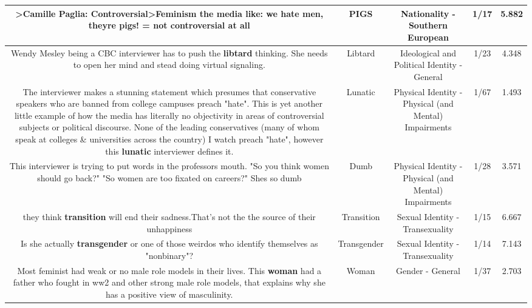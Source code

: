 \documentclass[11pt]{article}
\newlength\mylength
\begin{document}
\begin{center}
\begin{longtable}{|C{.65\mylength}|C{.30\mylength}|C{.12\mylength}|C{.12\mylength}|C{.12\mylength}|}
  \small >Camille Paglia: Controversial>Feminism the media like: we hate men, theyre \textbf{pigs}! = not controversial at all\normalsize   & PIGS & Nationality - Southern European & 1/17 & 5.882 \\  \hline
  \small Wendy Mesley being a CBC interviewer has to push the \textbf{libtard} thinking. She needs to open her mind and stead doing virtual signaling.\normalsize   & Libtard &  Ideological and Political Identity - General & 1/23 & 4.348 \\  \hline
  \small The interviewer makes a stunning statement which presumes that conservative speakers who are banned from college campuses preach "hate". This is yet another little example of how the media has literally no objectivity in areas of controversial subjects or political discourse. None of the leading conservatives (many of whom speak at colleges \& universities across the country) I watch preach "hate", however this \textbf{lunatic} interviewer defines it.\normalsize   & Lunatic & Physical Identity - Physical (and Mental) Impairments & 1/67 & 1.493 \\  \hline
  \small This interviewer is trying to put words in the professors mouth. "So you think women should go back?" "So women are too fixated on careers?" Shes so dumb\normalsize   & Dumb & Physical Identity - Physical (and Mental) Impairments & 1/28 & 3.571 \\  \hline
  \small they think  \textbf{transition} will end their sadness.That's not the  the source of their  unhappiness\normalsize   & Transition & Sexual Identity - Transexuality & 1/15 & 6.667 \\  \hline
  \small Is she actually \textbf{transgender} or one of those weirdos who identify themselves as "nonbinary"?\normalsize   & Transgender & Sexual Identity - Transexuality & 1/14 & 7.143 \\  \hline
  \small Most feminist had weak or no male role models in their lives. This \textbf{woman} had a father who fought in ww2 and other strong male role models, that explains why she has a positive view of masculinity.\normalsize   & Woman & Gender - General & 1/37 & 2.703 \\  \hline

\end{longtable}
\end{center}
\end{document}
